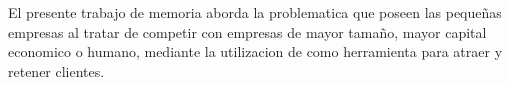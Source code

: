 El presente trabajo de memoria aborda la problematica que poseen las pequeñas empresas al tratar
de competir con empresas de mayor tamaño, mayor capital economico o humano, mediante la utilizacion
de {\GAM} como herramienta para atraer y retener clientes.


